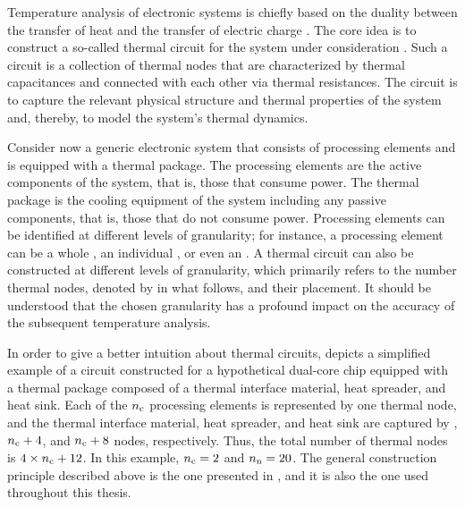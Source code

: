 Temperature analysis of electronic systems is chiefly based on the duality
between the transfer of heat and the transfer of electric charge
\cite{kreith2000}. The core idea is to construct a so-called thermal 
circuit for the system under consideration \cite{skadron2003}. Such a circuit is
a collection of thermal nodes that are characterized by thermal capacitances and
connected with each other via thermal resistances. The circuit is to capture the
relevant physical structure and thermal properties of the system and, thereby,
to model the system's thermal dynamics.

Consider now a generic electronic system that consists of \nc processing
elements and is equipped with a thermal package. The processing elements are the
active components of the system, that is, those that consume power. The thermal
package is the cooling equipment of the system including any passive components,
that is, those that do not consume power. Processing elements can be identified
at different levels of granularity; for instance, a processing element can be a
whole , an individual , or even an . A thermal 
circuit can also be constructed at different levels of granularity, which
primarily refers to the number thermal nodes, denoted by \nn in what follows,
and their placement. It should be understood that the chosen granularity has a
profound impact on the accuracy of the subsequent temperature analysis.


In order to give a better intuition about thermal  circuits,
 depicts a simplified example of a circuit constructed for a
hypothetical dual-core chip equipped with a thermal package composed of a
thermal interface material, heat spreader, and heat sink. Each of the ${n_\mathrm{c}}$
processing elements is represented by one thermal node, and the thermal
interface material, heat spreader, and heat sink are captured by \nc, ${n_\mathrm{c}} + 4$,
and ${n_\mathrm{c}} + 8$ nodes, respectively. Thus, the total number of thermal nodes \nn
is $4 \times {n_\mathrm{c}} + 12$. In this example, ${n_\mathrm{c}} = 2$ and ${n_\mathrm{n}} = 20$. The general
construction principle described above is the one presented in
\cite{skadron2003, huang2008}, and it is also the one used throughout this
thesis.

